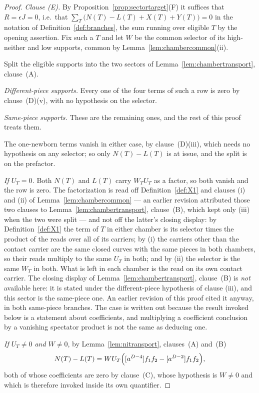\begin{proof}
\emph{Clause (E).} By Proposition~\ref{prop:sectortarget}(F) it suffices that $R=\epsilon J=0$, i.e.\
that $\sum_T\bigl(N(T)-L(T)+X(T)+Y(T)\bigr)=0$ in the notation of
Definition~\ref{def:branches}, the sum running over eligible $T$ by the
opening assertion. Fix such a $T$ and let $W$ be the
common selector of its high-neither and low supports, common by
Lemma~\ref{lem:chambercommon}(ii).

Split the eligible supports into the two sectors of
Lemma~\ref{lem:chambertransport}, clause~(A).

\emph{Different-piece supports.} Every one of the four terms of such a row is
zero by clause~(D)(v), with no hypothesis on the selector.

\emph{Same-piece supports.} These are the remaining ones, and the rest of this
proof treats them.

The one-newborn terms vanish in either case, by
clause~(D)(iii), which needs no hypothesis on any selector; so
only $N(T)-L(T)$ is at issue, and the split is on the prefactor.

\emph{If $U_T=0$.} Both $N(T)$ and $L(T)$ carry $W_TU_T$ as a factor, so both
vanish and the row is zero. The factorization is read off
Definition~\ref{def:X1} and clauses (i) and (ii) of
Lemma~\ref{lem:chambercommon} --- an earlier revision attributed those two
clauses to Lemma~\ref{lem:chambertransport}, clause~(B), which kept only (iii) when the two
were split --- and not off the latter's closing display: by
Definition~\ref{def:X1} the term of $T$ in either chamber is its selector times
the product of the reads over all of its carriers; by (i) the carriers other
than the contact carrier are the same closed curves with the same pieces in both
chambers, so their reads multiply to the same $U_T$ in both; and by (ii) the
selector is the same $W_T$ in both. What is left in each chamber is the read on
its own contact carrier. The closing display of
Lemma~\ref{lem:chambertransport}, clause~(B) is \emph{not} available here: it is stated
under the different-piece hypothesis of clause (iii), and this sector is the
same-piece one. An earlier revision of this proof cited it anyway, in both
same-piece branches. The case
is written out because the result invoked below is a statement about
coefficients, and multiplying a coefficient conclusion by a vanishing spectator
product is not the same as deducing one.

\emph{If $U_T\neq0$ and $W\neq0$}, by
Lemma~\ref{lem:nitransport}, clauses~(A) and~(B)
\[
   N(T)-L(T)=WU_T\Bigl([a^{D-4}]f_1f_2-[a^{D-2}]f_1f_2\Bigr),
\]
both of whose coefficients are zero by clause~(C), whose
hypothesis is $W\neq0$ and which is therefore invoked inside its own quantifier.


\end{proof}
